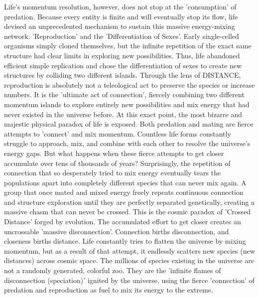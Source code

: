 Life's momentum resolution, however, does not stop at the 'consumption' of predation. Because every entity is finite and will eventually stop its flow, life devised an unprecedented mechanism to sustain this massive energy-mixing network: 'Reproduction' and the 'Differentiation of Sexes'.
Early single-celled organisms simply cloned themselves, but the infinite repetition of the exact same structure had clear limits in exploring new possibilities. Thus, life abandoned efficient simple replication and chose the differentiation of sexes to create new structures by colliding two different islands. Through the lens of DISTANCE, reproduction is absolutely not a teleological act to preserve the species or increase numbers. It is the 'ultimate act of connection', fiercely combining two different momentum islands to explore entirely new possibilities and mix energy that had never existed in the universe before.
At this exact point, the most bizarre and majestic physical paradox of life is exposed. Both predation and mating are fierce attempts to 'connect' and mix momentum. Countless life forms constantly struggle to approach, mix, and combine with each other to resolve the universe's energy gaps. But what happens when these fierce attempts to get closer accumulate over tens of thousands of years? 
Surprisingly, the repetition of connection that so desperately tried to mix energy eventually tears the populations apart into completely different species that can never mix again. A group that once mated and mixed energy freely repeats continuous connection and structure exploration until they are perfectly separated genetically, creating a massive chasm that can never be crossed.
This is the cosmic paradox of 'Crossed Distance' forged by evolution. The accumulated effort to get closer creates an uncrossable 'massive disconnection'. Connection births disconnection, and closeness births distance. Life constantly tries to flatten the universe by mixing momentum, but as a result of that attempt, it endlessly scatters new species (new distances) across cosmic space.
The millions of species existing in the universe are not a randomly generated, colorful zoo. They are the 'infinite flames of disconnection (speciation)' ignited by the universe, using the fierce 'connection' of predation and reproduction as fuel to mix its energy to the extreme.